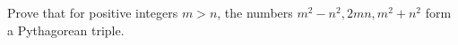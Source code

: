 Prove that for positive integers $ m>n $, the numbers $ m^2-n^2,2mn,m^2+n^2 $ form a Pythagorean triple.
